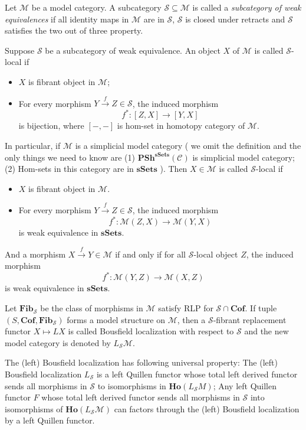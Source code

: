 \documentclass[b5paper,10pt]{article}
\begin{document}
Let $\mathcal{M}$ be a model category. A subcategory $\mathcal{S} \subseteq \mathcal{M}$ is called 
a \emph{subcategory of weak equivalences} if all identity maps in $\mathcal{M}$ are in $\mathcal{S}$, $\mathcal{S}$ is closed under retracts and $\mathcal{S}$ satisfies the two out of three property.
\begin{secdefn}
	Suppose $\mathcal{S}$ be a subcategory of weak equivalence. An object $X$ of $\mathcal{M}$ is called $\mathcal{S}$-local if 
	\begin{itemize}
		\item $X$ is fibrant object in $\mathcal{M}$;
		\item  For every morphism $Y \xrightarrow{f} Z \in \mathcal{S}$, the induced morphism 
		\[
		f^* \colon [Z,X] \to [Y,X]
		\]
		is bijection, where $[-,-]$ is hom-set in homotopy category of $\mathcal{M}$.
	\end{itemize}
\end{secdefn}
In particular, if $\mathcal{M}$ is a simplicial model category ( we omit the definition and the only things we need to know are (1) $\mathbf{PSh^{sSets}}(\mathcal{C})$ is simplicial model category; (2) Hom-sets in this category are in $\mathbf{sSets}$
 ). Then $X\in \mathcal{M}$ is called $\mathcal{S}$-local if 
 \begin{itemize}
 	\item $X$ is fibrant object in $\mathcal{M}$.
 	\item For every morphism $Y \xrightarrow{f} Z \in \mathcal{S}$, the induced morphism
 	\[
 	f^* \colon \mathcal{M}(Z,X) \to \mathcal{M}(Y,X)
 	\]
 	is weak equivalence in $\mathbf{sSets}$.
 \end{itemize}
And a morphism $X \xrightarrow{f} Y \in \mathcal{M}$ if and only if for all $\mathcal{S}$-local object $Z$, the induced morphism
\[
f^* \colon \mathcal{M}(Y,Z) \to \mathcal{M}(X,Z) 
\]
is weak equivalence in $\mathbf{sSets}$.
\begin{secdefn} Let $\mathbf{Fib}_{\mathcal{S}}$ be the class of morphisms in $\mathcal{M}$ satisfy RLP for $\mathcal{S} \cap \mathbf{Cof}$.
	If tuple $(S,\mathbf{Cof},\mathbf{Fib}_\mathcal{S})$ forms a model structure on $\mathcal{M}$, then a $\mathcal{S}$-fibrant replacement functor $ X \mapsto LX$ is called Bousfield localization with respect to $\mathcal{S}$ and the new model category is denoted by $L_\mathcal{S} \mathcal{M}$.
\end{secdefn}
The (left) Bousfield localization has following universal property: The (left) Bousfield localization $L_{\mathcal{S}}$ is a left Quillen functor whose total left derived functor sends all morphisms in $\mathcal{S}$ to isomorphisms in $\mathbf{Ho}(L_\mathcal{S}M)$; Any left Quillen functor $F$ whose total left derived functor sends all morphisms in $\mathcal{S}$ into isomorphisms of $\mathbf{Ho}(L_\mathcal{S}\mathcal{M})$ can factors through the (left) Bousfield localization by a left Quillen functor.
\end{document}
